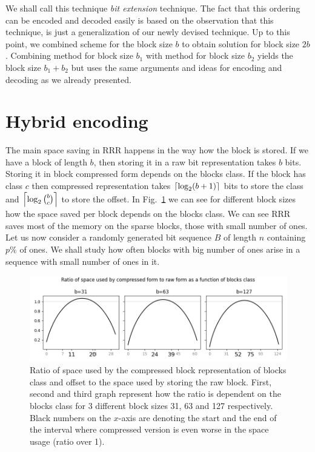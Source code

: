 We shall call this technique \textit{bit extension} technique. The fact that this
ordering can be encoded and decoded easily is based on the observation that this technique,
is just a generalization of our newly devised technique. Up to this point, we combined
scheme for the block size $b$ to obtain solution for block size $2b$. Combining method
for block size $b_1$ with method for block size $b_2$ yields the block size $b_1+b_2$
but uses the same arguments and ideas for encoding and decoding as we already presented. 

\section{Hybrid encoding}


The main space saving in RRR happens in the way how the block is stored. If we have
a block of length $b$, then storing it in a raw bit representation takes $b$ bits.
Storing it in block compressed form depends on the blocks class. If the block
has class $c$ then compressed representation takes $\left\lceil \log_2 (b+1) \right\rceil$ bits to store the
class and $\left\lceil \log_2{b\choose c} \right\rceil$ to store the offset. In
Fig.~\ref{obr:rrrSpaceSavings} we can see for different block sizes how the space saved
per block depends on the blocks class. We can see RRR saves most of the memory on the
sparse blocks, those with small number of ones. Let us now consider a randomly
generated bit sequence $B$ of length $n$ containing $p\%$ of ones. We shall study how
often blocks with big number of ones arise in a sequence with small number of ones in it.

\begin{figure}
	\centerline{
		\includegraphics[width=\textwidth]{images/rrr_space_savings}
	}
	\caption[TODO]{Ratio of space used by the compressed
    block representation of blocks class and offset to the space used by storing the raw
    block. First, second and third graph represent how the ratio is dependent on the blocks
    class for 3 different block sizes 31, 63 and 127 respectively. Black numbers on the $x$-axis
    are denoting the start and the end of the interval where compressed version is even worse
    in the space usage (ratio over 1).
	}
	\label{obr:rrrSpaceSavings}
\end{figure}

